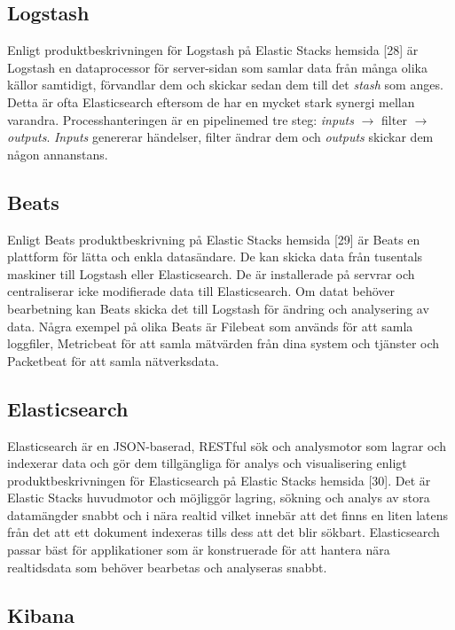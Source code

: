 \documentclass[12pt]{kththesis}
\begin{document}
\subsection{Logstash} 

Enligt produktbeskrivningen för Logstash på Elastic Stacks hemsida [28] är Logstash en dataprocessor för server-sidan som samlar data från många olika källor samtidigt, förvandlar dem och skickar sedan dem till det \textit{stash} som anges. Detta är ofta Elasticsearch eftersom de har en mycket stark synergi mellan varandra. Processhanteringen är en pipelinemed tre steg: \textit{inputs} $\rightarrow$ filter $\rightarrow$ \textit{outputs}. \textit{Inputs} genererar händelser, filter ändrar dem och \textit{outputs} skickar dem någon annanstans.

\subsection{Beats}

Enligt Beats produktbeskrivning på Elastic Stacks hemsida [29] är Beats en plattform för lätta och enkla datasändare. De kan skicka data från tusentals maskiner till Logstash eller Elasticsearch. De är installerade på servrar och centraliserar icke modifierade data till Elasticsearch. Om datat behöver bearbetning kan Beats skicka det till Logstash för ändring och analysering av data. Några exempel på olika Beats är Filebeat som används för att samla loggfiler, Metricbeat för att samla mätvärden från dina system och tjänster och Packetbeat för att samla nätverksdata. 

\subsection{Elasticsearch}

Elasticsearch är en JSON-baserad, RESTful sök och analysmotor som lagrar och indexerar data och gör dem tillgängliga för analys och visualisering enligt produktbeskrivningen för Elasticsearch på Elastic Stacks hemsida [30]. Det är Elastic Stacks huvudmotor och möjliggör lagring, sökning och analys av stora datamängder snabbt och i nära realtid vilket innebär att det finns en liten latens från det att ett dokument indexeras tills dess att det blir sökbart. Elasticsearch passar bäst för applikationer som är konstruerade för att hantera nära realtidsdata som behöver bearbetas och analyseras snabbt. 
 

\subsection{Kibana}
\end{document}
